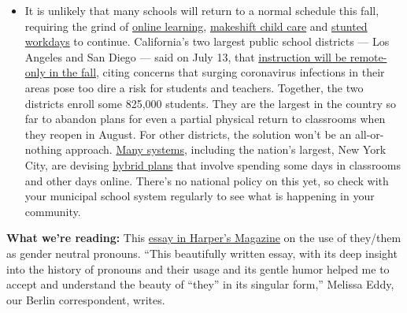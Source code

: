 \begin{itemize}
  \begin{itemize}
  \tightlist
  \item
    It is unlikely that many schools will return to a normal schedule
    this fall, requiring the grind of
    \href{https://www.nytimes.com/2020/06/05/us/coronavirus-education-lost-learning.html?action=click\&pgtype=Article\&state=default\&region=MAIN_CONTENT_3\&context=storylines_faq}{online
    learning},
    \href{https://www.nytimes.com/2020/05/29/us/coronavirus-child-care-centers.html?action=click\&pgtype=Article\&state=default\&region=MAIN_CONTENT_3\&context=storylines_faq}{makeshift
    child care} and
    \href{https://www.nytimes.com/2020/06/03/business/economy/coronavirus-working-women.html?action=click\&pgtype=Article\&state=default\&region=MAIN_CONTENT_3\&context=storylines_faq}{stunted
    workdays} to continue. California's two largest public school
    districts --- Los Angeles and San Diego --- said on July 13, that
    \href{https://www.nytimes.com/2020/07/13/us/lausd-san-diego-school-reopening.html?action=click\&pgtype=Article\&state=default\&region=MAIN_CONTENT_3\&context=storylines_faq}{instruction
    will be remote-only in the fall}, citing concerns that surging
    coronavirus infections in their areas pose too dire a risk for
    students and teachers. Together, the two districts enroll some
    825,000 students. They are the largest in the country so far to
    abandon plans for even a partial physical return to classrooms when
    they reopen in August. For other districts, the solution won't be an
    all-or-nothing approach.
    \href{https://bioethics.jhu.edu/research-and-outreach/projects/eschool-initiative/school-policy-tracker/}{Many
    systems}, including the nation's largest, New York City, are
    devising
    \href{https://www.nytimes.com/2020/06/26/us/coronavirus-schools-reopen-fall.html?action=click\&pgtype=Article\&state=default\&region=MAIN_CONTENT_3\&context=storylines_faq}{hybrid
    plans} that involve spending some days in classrooms and other days
    online. There's no national policy on this yet, so check with your
    municipal school system regularly to see what is happening in your
    community.
  \end{itemize}
\end{itemize}

\textbf{What we're reading:} This
\href{https://harpers.org/archive/2020/08/all-my-pronouns-the-singular-they/}{essay
in Harper's Magazine} on the use of they/them as gender neutral
pronouns. ``This beautifully written essay, with its deep insight into
the history of pronouns and their usage and its gentle humor helped me
to accept and understand the beauty of ``they'' in its singular form,''
Melissa Eddy, our Berlin correspondent, writes.

